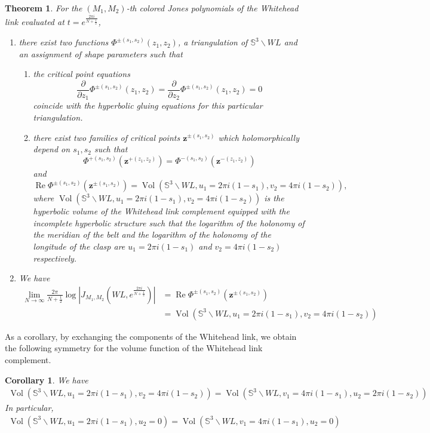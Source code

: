 \documentclass[10pt,a4paper]{article}
\newcommand{\lt}{\left}
\newcommand{\rt}{\right}
\def\Vol{\operatorname{Vol}}
\def \Re{\operatorname{Re}}
\newtheorem{theorem}{Theorem}
\newtheorem{corollary}{Corollary}
\def\SS{{\mathbb S}}
\def\Vol{\operatorname{Vol}}
\def \Re{\operatorname{Re}}
\begin{document}
\begin{theorem}\label{mainthmWL} For the $(M_1,M_2)$-th colored Jones polynomials of the Whitehead link evaluated at $t=e^{\frac{2\pi i}{N+\frac{1}{2}}}$,
\begin{enumerate}
\item there exist two functions $\Phi^{\pm(s_1,s_2)}(z_1,z_2)$, a triangulation of $\SS^3 \backslash WL$ and an assignment of shape parameters such that
\begin{enumerate}
\item the critical point equations 
$$\frac{\partial}{\partial z_1}\Phi^{\pm(s_1,s_2)}(z_1,z_2)
=\frac{\partial}{\partial z_2}\Phi^{\pm(s_1,s_2)}(z_1,z_2)
=0$$
coincide with the hyperbolic gluing equations for this particular triangulation.
\item there exist two families of critical points $\mathbf{z}^{\pm(s_1, s_2)}$ which holomorphically depend on $s_1,s_2$ such that 
$$  \Phi^{+(s_1,s_2)}(\mathbf{z}^{+(z_1,z_2)})
= \Phi^{-(s_1,s_2)}(\mathbf{z}^{-(z_1,z_2)}) $$
and
$$ \Re \Phi^{\pm(s_1, s_2)}(\mathbf{z}^{\pm(s_1, s_2)}) = \Vol\lt(\SS^3 \backslash WL, u_1 = 2\pi i (1 - s_1), v_2=4\pi i (1 - s_2)\rt) ,$$
where $\Vol\lt(\SS^3 \backslash WL, u_1 = 2\pi i (1 - s_1), v_2=4\pi i (1 - s_2)\rt)  $ is the hyperbolic volume of the Whitehead link complement equipped with the incomplete hyperbolic structure such that the logarithm of the holonomy of the meridian of the belt and the logarithm of the holonomy of the longitude of the clasp are $u_1 = 2\pi i (1 - s_1)$ and $v_2=4\pi i (1 - s_2)$ respectively.
\end{enumerate}
\item We have
\begin{align*}
\lim_{N\to \infty} \frac{2\pi}{N+\frac{1}{2}} \log \lt| J_{M_1,M_2}(WL,e^{\frac{2\pi i}{N+\frac{1}{2}}}) \rt| 
&= \Re \Phi^{\pm(s_1, s_2)}(\mathbf{z}^{\pm(s_1, s_2)}) \\
&= \Vol\lt(\SS^3 \backslash WL, u_1 = 2\pi i (1 - s_1), v_2=4\pi i (1 - s_2)\rt)
\end{align*}
\end{enumerate}
\end{theorem}

As a corollary, by exchanging the components of the Whitehead link, we obtain the following symmetry for the volume function of the Whitehead link complement.

\begin{corollary}\label{WLVolsym}
We have
\begin{align}\label{Volsym1}
\Vol(\SS^3\backslash WL, u_1 = 2\pi i(1-s_1), v_2= 4\pi i(1-s_2))
= \Vol(\SS^3\backslash WL, v_1= 4\pi i(1-s_1), u_2 = 2\pi i(1-s_2))
\end{align}
In particular,
\begin{align}\label{Volsym2}
\Vol(\SS^3\backslash WL, u_1 = 2\pi i(1-s_1), u_2=0)
= \Vol(\SS^3\backslash WL, v_1= 4\pi i(1-s_1), u_2 = 0)
\end{align}
\end{corollary}
\end{document}
